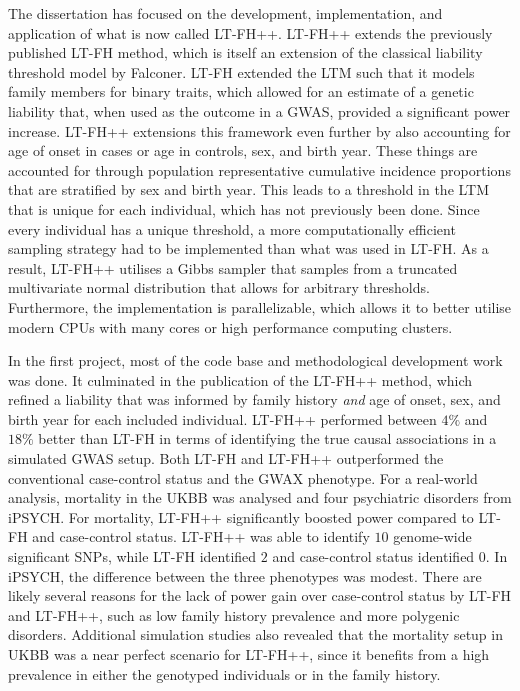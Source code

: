 The dissertation has focused on the development, implementation, and application of what is now called LT-FH++. LT-FH++ extends the previously published LT-FH method, which is itself an extension of the classical liability threshold model by Falconer. LT-FH extended the LTM such that it models family members for binary traits, which allowed for an estimate of a genetic liability that, when used as the outcome in a GWAS, provided a significant power increase. LT-FH++ extensions this framework even further by also accounting for age of onset in cases or age in controls, sex, and birth year. These things are accounted for through population representative cumulative incidence proportions that are stratified by sex and birth year. This leads to a threshold in the LTM that is unique for each individual, which has not previously been done. Since every individual has a unique threshold, a more computationally efficient sampling strategy had to be implemented than what was used in LT-FH. As a result, LT-FH++ utilises a Gibbs sampler that samples from a truncated multivariate normal distribution that allows for arbitrary thresholds. Furthermore, the implementation is parallelizable, which allows it to better utilise modern CPUs with many cores or high performance computing clusters.

In the first project, most of the code base and methodological development work was done. It culminated in the publication of the LT-FH++ method, which refined a liability that was informed by family history \textit{and} age of onset, sex, and birth year for each included individual. LT-FH++ performed between $ 4\% $ and $ 18\% $ better than LT-FH in terms of identifying the true causal associations in a simulated GWAS setup. Both LT-FH and LT-FH++ outperformed the conventional case-control status and the GWAX phenotype. For a real-world analysis, mortality in the UKBB was analysed and four psychiatric disorders from iPSYCH. For mortality, LT-FH++ significantly boosted power compared to LT-FH and case-control status. LT-FH++ was able to identify $ 10 $ genome-wide significant SNPs, while LT-FH identified $ 2 $ and case-control status identified $ 0 $. In iPSYCH, the difference between the three phenotypes was modest. There are likely several reasons for the lack of power gain over case-control status by LT-FH and LT-FH++, such as low family history prevalence and more polygenic disorders. Additional simulation studies also revealed that the mortality setup in UKBB was a near perfect scenario for LT-FH++, since it benefits from a high prevalence in either the genotyped individuals or in the family history.

